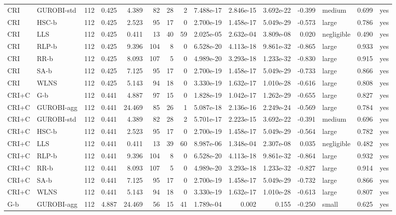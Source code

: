 \begin{table}[htbp]
\begin{tabular}{llrrrrrrrrrrlrr}
CRI & GUROBI-std & 112 & 0.425 & 4.389 & 82 & 28 & 2 & 7.488e-17 & 2.846e-15 & 3.692e-22 & -0.399 & medium & 0.699 & yes \\
CRI & HSC-b & 112 & 0.425 & 2.523 & 95 & 17 & 0 & 2.700e-19 & 1.458e-17 & 5.049e-29 & -0.573 & large & 0.786 & yes \\
CRI & LLS & 112 & 0.425 & 0.411 & 13 & 40 & 59 & 2.025e-05 & 2.632e-04 & 3.809e-08 & 0.020 & negligible & 0.490 & yes \\
CRI & RLP-b & 112 & 0.425 & 9.396 & 104 & 8 & 0 & 6.528e-20 & 4.113e-18 & 9.861e-32 & -0.865 & large & 0.933 & yes \\
CRI & RR-b & 112 & 0.425 & 8.093 & 107 & 5 & 0 & 4.989e-20 & 3.293e-18 & 1.233e-32 & -0.830 & large & 0.915 & yes \\
CRI & SA-b & 112 & 0.425 & 7.125 & 95 & 17 & 0 & 2.700e-19 & 1.458e-17 & 5.049e-29 & -0.733 & large & 0.866 & yes \\
CRI & WLNS & 112 & 0.425 & 5.143 & 94 & 18 & 0 & 3.330e-19 & 1.632e-17 & 1.010e-28 & -0.616 & large & 0.808 & yes \\
CRI+C & G-b & 112 & 0.441 & 4.887 & 97 & 15 & 0 & 1.828e-19 & 1.042e-17 & 1.262e-29 & -0.655 & large & 0.827 & yes \\
CRI+C & GUROBI-agg & 112 & 0.441 & 24.469 & 85 & 26 & 1 & 5.087e-18 & 2.136e-16 & 2.249e-24 & -0.569 & large & 0.784 & yes \\
CRI+C & GUROBI-std & 112 & 0.441 & 4.389 & 82 & 28 & 2 & 5.701e-17 & 2.223e-15 & 3.692e-22 & -0.391 & medium & 0.696 & yes \\
CRI+C & HSC-b & 112 & 0.441 & 2.523 & 95 & 17 & 0 & 2.700e-19 & 1.458e-17 & 5.049e-29 & -0.564 & large & 0.782 & yes \\
CRI+C & LLS & 112 & 0.441 & 0.411 & 13 & 39 & 60 & 8.987e-06 & 1.348e-04 & 2.307e-08 & 0.035 & negligible & 0.482 & yes \\
CRI+C & RLP-b & 112 & 0.441 & 9.396 & 104 & 8 & 0 & 6.528e-20 & 4.113e-18 & 9.861e-32 & -0.864 & large & 0.932 & yes \\
CRI+C & RR-b & 112 & 0.441 & 8.093 & 107 & 5 & 0 & 4.989e-20 & 3.293e-18 & 1.233e-32 & -0.827 & large & 0.914 & yes \\
CRI+C & SA-b & 112 & 0.441 & 7.125 & 95 & 17 & 0 & 2.700e-19 & 1.458e-17 & 5.049e-29 & -0.732 & large & 0.866 & yes \\
CRI+C & WLNS & 112 & 0.441 & 5.143 & 94 & 18 & 0 & 3.330e-19 & 1.632e-17 & 1.010e-28 & -0.613 & large & 0.807 & yes \\
G-b & GUROBI-agg & 112 & 4.887 & 24.469 & 56 & 15 & 41 & 1.789e-04 & 0.002 & 0.155 & -0.250 & small & 0.625 & yes \\

\end{tabular}
\end{table}
